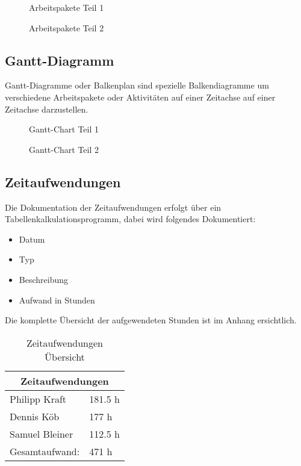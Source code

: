 \begin{figure}[H]
  \centering
  \caption{Arbeitspakete Teil 1}
\end{figure}

\begin{figure}[H]
  \centering
  \caption{Arbeitspakete Teil 2}
\end{figure}

\subsection{Gantt-Diagramm}
Gantt-Diagramme oder Balkenplan sind spezielle Balkendiagramme um verschiedene
Arbeitspakete oder Aktivitäten auf einer Zeitachse auf einer Zeitachse
darzustellen.

\clearpage \newpage
\begin{sidewaysfigure}[htbp]
  \centering
  \caption{Gantt-Chart Teil 1}
\end{sidewaysfigure}

\begin{sidewaysfigure}[htbp]
  \centering
  \caption{Gantt-Chart Teil 2}
\end{sidewaysfigure}
\clearpage

\subsection{Zeitaufwendungen}

Die Dokumentation der Zeitaufwendungen erfolgt über ein
Tabellenkalkulationsprogramm, dabei wird folgendes Dokumentiert:

\begin{itemize}
  \item Datum
  \item Typ
  \item Beschreibung
  \item Aufwand in Stunden
\end{itemize}

Die komplette Übersicht der aufgewendeten Stunden ist im Anhang ersichtlich.

\begin{table}[H]
  \centering
  \begin{tabular}{@{}ll@{}}
  \toprule
  \multicolumn{2}{c}{\textbf{Zeitaufwendungen}} \\ \midrule
  Philipp Kraft             & 181.5 h           \\
  Dennis Köb                & 177 h             \\
  Samuel Bleiner            & 112.5 h           \\ \midrule
  Gesamtaufwand:            & 471 h             \\ \bottomrule
  \end{tabular}
  \caption{Zeitaufwendungen Übersicht}
\end{table}